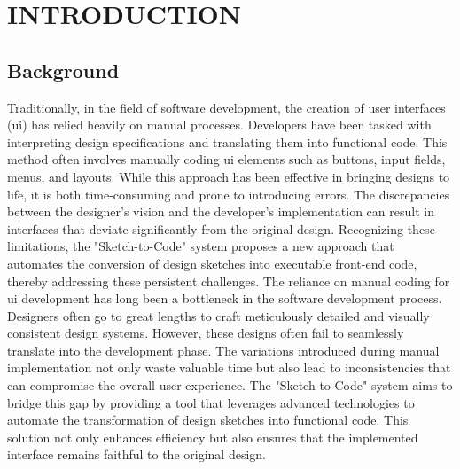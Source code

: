 
\section{\MakeUppercase{Introduction}}

    \subsection{Background}
    Traditionally, in the field of software development, the creation of user 
    interfaces (\gls{ui}) has relied heavily on manual processes. Developers 
    have been tasked with interpreting design specifications and translating 
    them into functional code. This method often involves manually coding \gls{ui} elements such as buttons, input fields, menus, and layouts. While this approach has been effective in bringing designs to life, it is both time-consuming and prone to introducing errors. The discrepancies between the designer’s vision and the developer’s implementation can result in interfaces that deviate significantly from the original design. Recognizing these limitations, the "Sketch-to-Code" system proposes a new approach that automates the conversion of design sketches into executable front-end code, thereby addressing these persistent challenges.
    The reliance on manual coding for \gls{ui} development has long been a bottleneck in the software development process. Designers often go to great lengths to craft meticulously detailed and visually consistent design systems. However, these designs often fail to seamlessly translate into the development phase. The variations introduced during manual implementation not only waste valuable time but also lead to inconsistencies that can compromise the overall user experience. The "Sketch-to-Code" system aims to bridge this gap by providing a tool that leverages advanced technologies to automate the transformation of design sketches into functional code. This solution not only enhances efficiency but also ensures that the implemented interface remains faithful to the original design.
    
